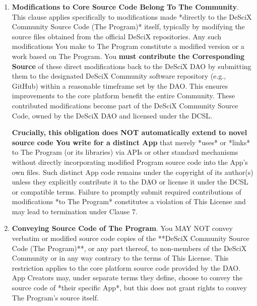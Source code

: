 \documentclass{article}
\begin{document}
\begin{enumerate}
        \item \textbf{Modifications to Core Source Code Belong To The Community}. \label{dcsl:modifications}
        This clause applies specifically to modifications made *directly to the DeSciX Community Source Code (The Program)* itself, typically by modifying the source files obtained from the official DeSciX repositories. Any such modifications You make to The Program constitute a modified version or a work based on The Program. You \textbf{must contribute the Corresponding Source} of these direct modifications back to the DeSciX DAO by submitting them to the designated DeSciX Community software repository (e.g., GitHub) within a reasonable timeframe set by the DAO. This ensures improvements to the core platform benefit the entire Community. These contributed modifications become part of the DeSciX Community Source Code, owned by the DeSciX DAO and licensed under the DCSL.

        \textbf{Crucially, this obligation does NOT automatically extend to novel source code You write for a distinct App} that merely *uses* or *links* to The Program (or its libraries) via APIs or other standard mechanisms without directly incorporating modified Program source code into the App's own files. Such distinct App code remains under the copyright of its author(s) unless they explicitly contribute it to the DAO or license it under the DCSL or compatible terms. Failure to promptly submit required contributions of modifications *to The Program* constitutes a violation of This License and may lead to termination under Clause 7.

        \item \textbf{Conveying Source Code of The Program}.
        You MAY NOT convey verbatim or modified source code copies of the **DeSciX Community Source Code (The Program)**, or any part thereof, to non-members of the DeSciX Community or in any way contrary to the terms of This License. This restriction applies to the core platform source code provided by the DAO. App Creators may, under separate terms they define, choose to convey the source code of *their specific App*, but this does not grant rights to convey The Program's source itself.


\end{enumerate}
\end{document}
